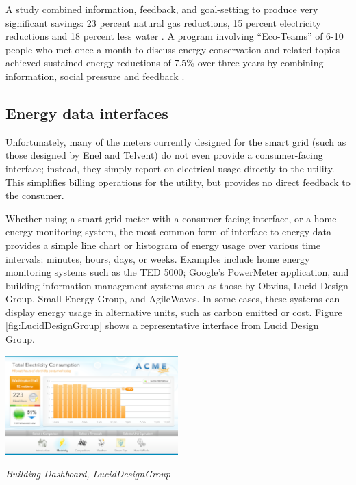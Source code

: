 A study combined information, feedback, and goal-setting to produce very
significant savings: 23 percent natural gas reductions, 15 percent
electricity reductions and 18 percent less water \cite{Vollink99}.  A
program involving ``Eco-Teams'' of 6-10 people who met once a month to
discuss energy conservation and related topics achieved sustained energy
reductions of 7.5\% over three years by combining information, social
pressure and feedback \cite{Staats04}.

\subsection{Energy data interfaces}

Unfortunately, many of the meters currently designed for the smart grid
(such as those designed by Enel and Telvent) do not even provide a
consumer-facing interface; instead, they simply report on electrical usage
directly to the utility.  This simplifies billing operations for the
utility, but provides no direct feedback to the consumer.

Whether using a smart grid meter with a consumer-facing interface, or a
home energy monitoring system, the most common form of interface to energy
data provides a simple line chart or histogram of energy usage over various
time intervals: minutes, hours, days, or weeks.  Examples include home
energy monitoring systems such as the TED 5000; Google's PowerMeter
application, and building information management systems such as those by
Obvius, Lucid Design Group, Small Energy Group, and AgileWaves. In some
cases, these systems can display energy usage in alternative units, such as
carbon emitted or cost.  Figure \ref{fig:LucidDesignGroup} shows a representative interface from
Lucid Design Group.

\begin{floatingfigure}[l]{3.25in}
  \center
  \includegraphics[width=0.5\textwidth]{luciddesigngroup.3.eps}
  \caption{\em \small Building Dashboard, LucidDesignGroup}
  \label{fig:LucidDesignGroup}
\end{floatingfigure} 


